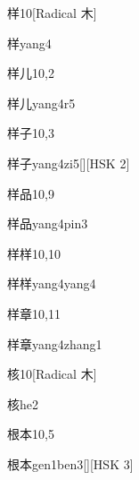 \begin{entry}{样}{10}[Radical 木]
  \begin{phonetics}{样}{yang4}
  \end{phonetics}
\end{entry}

\begin{entry}{样儿}{10,2}
  \begin{phonetics}{样儿}{yang4r5}
  \end{phonetics}
\end{entry}

\begin{entry}{样子}{10,3}
  \begin{phonetics}{样子}{yang4zi5}[][HSK 2]
  \end{phonetics}
\end{entry}

\begin{entry}{样品}{10,9}
  \begin{phonetics}{样品}{yang4pin3}
  \end{phonetics}
\end{entry}

\begin{entry}{样样}{10,10}
  \begin{phonetics}{样样}{yang4yang4}
  \end{phonetics}
\end{entry}

\begin{entry}{样章}{10,11}
  \begin{phonetics}{样章}{yang4zhang1}
  \end{phonetics}
\end{entry}

\begin{entry}{核}{10}[Radical 木]
  \begin{phonetics}{核}{he2}
  \end{phonetics}
\end{entry}

\begin{entry}{根本}{10,5}
  \begin{phonetics}{根本}{gen1ben3}[][HSK 3]
  \end{phonetics}
\end{entry}

